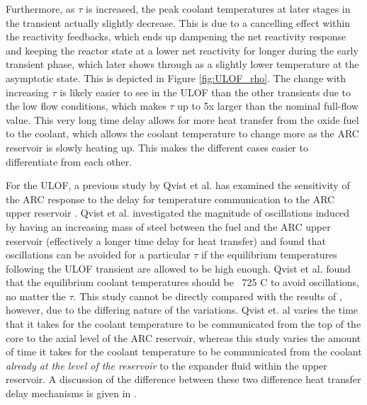 \documentclass[11pt, oneside]{article}   	%
\begin{document}
Furthermore, as $\tau$ is increased, the peak coolant temperatures at later stages in the transient actually slightly decrease.
This is due to a cancelling effect within the reactivity feedbacks, which ends up dampening the net reactivity response and keeping the reactor state at a lower net reactivity for longer during the early transient phase, which later shows through as a slightly lower temperature at the asymptotic state.
This is depicted in Figure \ref{fig:ULOF_rho}.
The change with increasing $\tau$ is likely easier to see in the ULOF than the other transients due to the low flow conditions, which makes $\tau$ up to 5x larger than the nominal full-flow value. 
This very long time delay allows for more heat transfer from the oxide fuel to the coolant, which allows the coolant temperature to change more as the ARC reservoir is slowly heating up. 
This makes the different cases easier to differentiate from each other.

For the ULOF, a previous study by Qvist et al. has examined the sensitivity of the ARC response to the delay for temperature communication to the ARC upper reservoir \cite{ARC_Annals}.
Qvist et al. investigated the magnitude of oscillations induced by having an increasing mass of steel between the fuel and the ARC upper reservoir (effectively a longer time delay for heat transfer) and found that oscillations can be avoided for a particular $\tau$ if the equilibrium temperatures following the ULOF transient are allowed to be high enough.
Qvist et al. found that the equilibrium coolant temperatures should be ~725 C to avoid oscillations, no matter the $\tau$.
This study cannot be directly compared with the results of \cite{ARC_Annals}, however, due to the differing nature of the variations. 
Qvist et. al varies the time that it takes for the coolant temperature to be communicated from the top of the core to the axial level of the ARC reservoir, whereas this study varies the amount of time it takes for the coolant temperature to be communicated from the coolant \textit{already at the level of the reservoir} to the expander fluid within the upper reservoir.
A discussion of the difference between these two difference heat transfer delay mechanisms is given in \cite{ULOF_oscillationsReport}.
\end{document}
